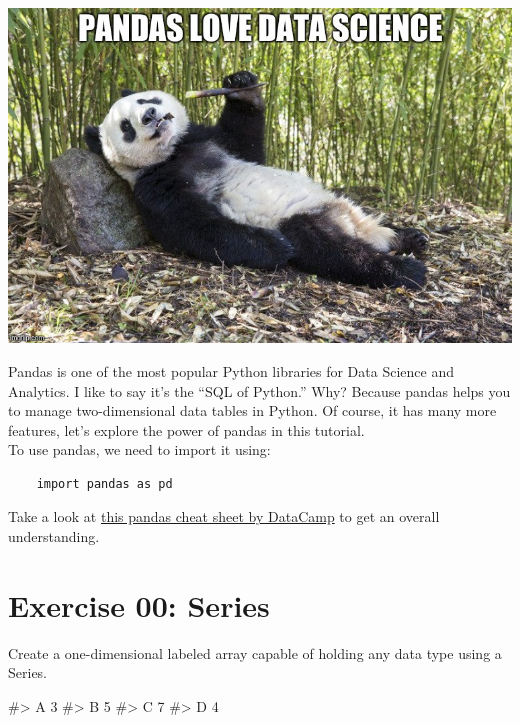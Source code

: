 \documentclass{42-en}
\begin{document}
\centerline{\includegraphics[width=150mm]{images/panda.jpeg}}

Pandas is one of the most popular Python libraries for Data Science and Analytics. I like to say it’s the “SQL of Python.” Why? Because pandas helps you to manage two-dimensional data tables in Python. Of course, it has many more features, let’s explore the power of pandas in this tutorial.\\
To use pandas, we need to import it using:\\
\begin{lstlisting}
    import pandas as pd
\end{lstlisting}
Take a look at \href{https://s3.amazonaws.com/assets.datacamp.com/blog_assets/PandasPythonForDataScience.pdf}{this pandas cheat sheet by DataCamp} to get an overall understanding.


\chapter{Exercise 00: Series}
\makeheaderfiles

Create a one-dimensional labeled array capable of holding any data type using a Series.\\

\begin{42console}
#> A    3
#> B    5
#> C    7
#> D    4
\end{42console}

\nextexercice
\newpage

\end{document}
